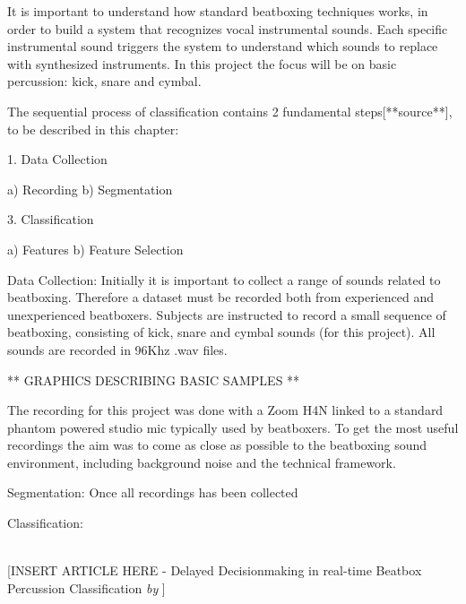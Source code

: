 It is important to understand how standard beatboxing techniques works, in order to build a system that recognizes vocal instrumental sounds. Each specific instrumental sound triggers the system to understand which sounds to replace with synthesized instruments. In this project the focus will be on basic percussion: kick, snare and cymbal.

The sequential process of classification contains 2 fundamental steps[**source**], to be described in this chapter: 

1.	Data Collection

	a)	Recording
	b)	Segmentation
	
3. Classification

	a)	Features
	b)	Feature Selection

Data Collection: 
Initially it is important to collect a range of sounds related to beatboxing. Therefore a dataset must be recorded both from experienced and unexperienced beatboxers. Subjects are instructed to record a small sequence of beatboxing, consisting of kick, snare and cymbal sounds (for this project). All sounds are recorded in 96Khz .wav files. 

** GRAPHICS DESCRIBING BASIC SAMPLES ** 

The recording for this project was done with a Zoom H4N linked to a standard phantom powered studio mic typically used by beatboxers. To get the most useful recordings the aim was to come as close as possible to the beatboxing sound environment, including background noise and the technical framework.


Segmentation:
Once all recordings has been collected

Classification: 




\\

[INSERT ARTICLE HERE - Delayed Decisionmaking in real-time Beatbox Percussion Classification \textit{by} \citep{Stowell2010} ]
